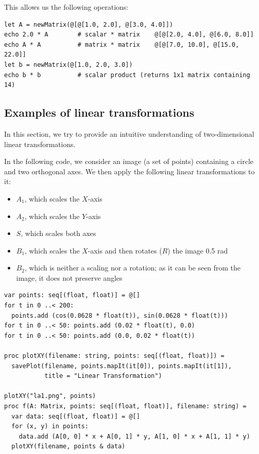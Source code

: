\documentclass[justified, sixbynine]{tufte-book}
\theoremstyle{plain}%
\newtheorem * {corollary}{Corollary}
\theoremstyle{definition}
\theoremstyle{remark}
\newtheorem * {remark}{Remark}
\newtheorem * {note}{Note}
\begin{document}
\begin{fullwidth}
This allows us the following operations:
\begin{lstlisting}
let A = newMatrix(@[@[1.0, 2.0], @[3.0, 4.0]])
echo 2.0 * A        # scalar * matrix    @[@[2.0, 4.0], @[6.0, 8.0]]
echo A * A          # matrix * matrix    @[@[7.0, 10.0], @[15.0, 22.0]]
let b = newMatrix(@[1.0, 2.0, 3.0])
echo b * b          # scalar product (returns 1x1 matrix containing 14)
\end{lstlisting}

\goodbreak\subsection{Examples of linear transformations}


In this section, we try to provide an intuitive understanding of two-dimensional linear transformations.

In the following code, we consider an image (a set of points) containing a circle and two orthogonal axes. We then apply the following linear transformations to it:
\begin{itemize}
\item $A_1$, which scales the $X$-axis
\item $A_2$, which scales the $Y$-axis
\item $S$, which scales both axes
\item $B_1$, which scales the $X$-axis and then rotates ($R$) the image 0.5 rad
\item $B_2$, which is neither a scaling nor a rotation; as it can be seen from the image, it does not preserve angles
\end{itemize}

\begin{lstlisting}
var points: seq[(float, float)] = @[]
for t in 0 ..< 200:
  points.add (cos(0.0628 * float(t)), sin(0.0628 * float(t)))
for t in 0 ..< 50: points.add (0.02 * float(t), 0.0)
for t in 0 ..< 50: points.add (0.0, 0.02 * float(t))

proc plotXY(filename: string, points: seq[(float, float)]) =
  savePlot(filename, points.mapIt(it[0]), points.mapIt(it[1]),
           title = "Linear Transformation")

plotXY("la1.png", points)
proc f(A: Matrix, points: seq[(float, float)], filename: string) =
  var data: seq[(float, float)] = @[]
  for (x, y) in points:
    data.add (A[0, 0] * x + A[0, 1] * y, A[1, 0] * x + A[1, 1] * y)
  plotXY(filename, points & data)


\end{lstlisting}
\end{fullwidth}
\end{document}
